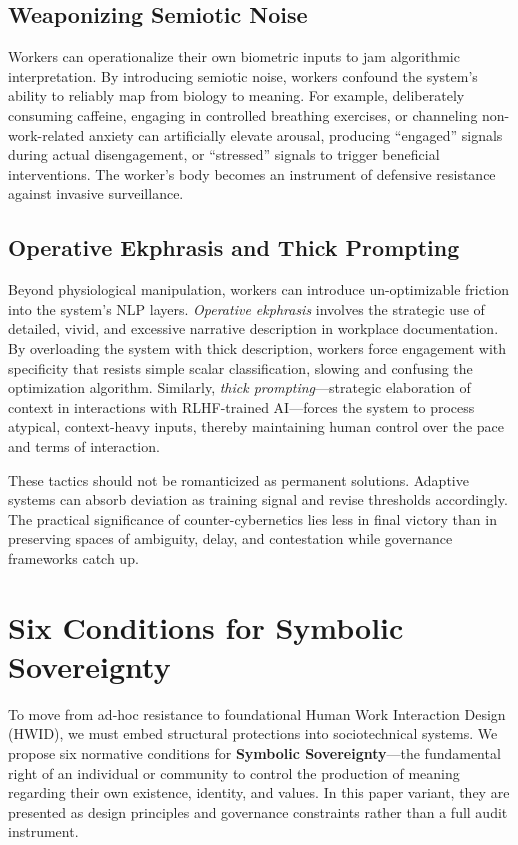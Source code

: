 \documentclass[11pt, a4paper]{article}
\begin{document}
\subsection{Weaponizing Semiotic Noise}
Workers can operationalize their own biometric inputs to jam algorithmic interpretation. By introducing semiotic noise, workers confound the system's ability to reliably map from biology to meaning. For example, deliberately consuming caffeine, engaging in controlled breathing exercises, or channeling non-work-related anxiety can artificially elevate arousal, producing ``engaged'' signals during actual disengagement, or ``stressed'' signals to trigger beneficial interventions. The worker's body becomes an instrument of defensive resistance against invasive surveillance.

\subsection{Operative Ekphrasis and Thick Prompting}
Beyond physiological manipulation, workers can introduce un-optimizable friction into the system's NLP layers. \textit{Operative ekphrasis} involves the strategic use of detailed, vivid, and excessive narrative description in workplace documentation. By overloading the system with thick description, workers force engagement with specificity that resists simple scalar classification, slowing and confusing the optimization algorithm. Similarly, \textit{thick prompting}---strategic elaboration of context in interactions with RLHF-trained AI---forces the system to process atypical, context-heavy inputs, thereby maintaining human control over the pace and terms of interaction.

These tactics should not be romanticized as permanent solutions. Adaptive systems can absorb deviation as training signal and revise thresholds accordingly. The practical significance of counter-cybernetics lies less in final victory than in preserving spaces of ambiguity, delay, and contestation while governance frameworks catch up.

\section{Six Conditions for Symbolic Sovereignty}

To move from ad-hoc resistance to foundational Human Work Interaction Design (HWID), we must embed structural protections into sociotechnical systems. We propose six normative conditions for \textbf{Symbolic Sovereignty}---the fundamental right of an individual or community to control the production of meaning regarding their own existence, identity, and values. In this paper variant, they are presented as design principles and governance constraints rather than a full audit instrument.
\end{document}

